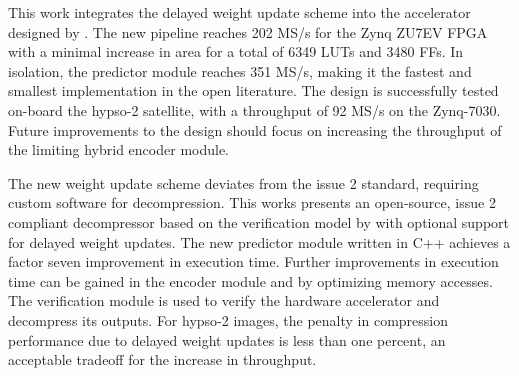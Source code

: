 This work integrates the delayed weight update scheme into the accelerator designed by \citeauthor{vorhaugHyperspectralImageCompression2024}. The new pipeline reaches 202 MS/s for the Zynq ZU7EV \acrshort{FPGA} with a minimal increase in area for a total of 6349 \acrshort{LUT}s and 3480 \acrshort{FF}s. In isolation, the predictor module reaches 351 MS/s, making it the fastest and smallest implementation in the open literature. The design is successfully tested on-board the \acrshort{hypso}-2 satellite, with a throughput of 92 MS/s on the Zynq-7030. Future improvements to the design should focus on increasing the throughput of the limiting hybrid encoder module.

The new weight update scheme deviates from the issue 2 standard, requiring custom software for decompression. This works presents an open-source, issue 2 compliant decompressor based on the verification model by \citeauthor{vorhaugHyperspectralImageCompression2024} with optional support for delayed weight updates. The new predictor module written in C++ achieves a factor seven improvement in execution time. Further improvements in execution time can be gained in the encoder module and by optimizing memory accesses. The verification module is used to verify the hardware accelerator and decompress its outputs. For \acrshort{hypso}-2 images, the penalty in compression performance due to delayed weight updates is less than one percent, an acceptable tradeoff for the increase in throughput.

